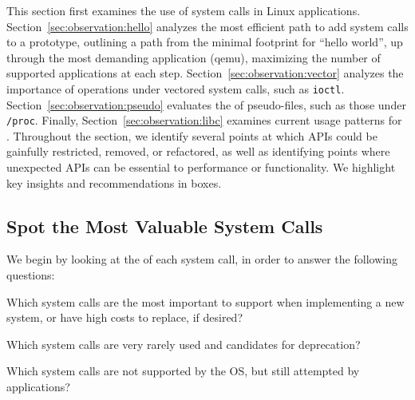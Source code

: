 This section first examines the use of system calls in Linux applications.
Section~\ref{sec:observation:hello} analyzes the most efficient path to add system calls
to a prototype, outlining a path from the minimal footprint for ``hello world'', 
up through the most demanding application (qemu), maximizing the number
of supported applications at each step.
Section~\ref{sec:observation:vector} analyzes the importance of operations
under vectored system calls, such as {\tt ioctl}.
Section~\ref{sec:observation:pseudo} evaluates the \usagemetric{} of 
pseudo-files, such as those under {\tt /proc}.
Finally, Section~\ref{sec:observation:libc}
examines current usage patterns for \libc{}.
Throughout the section, we identify several points at which APIs could be gainfully
restricted, removed, or refactored,
as well as identifying points where unexpected APIs can be essential to performance or
functionality.
We highlight key insights and recommendations in boxes.


\subsection{Spot the Most Valuable System Calls}
\label{sec:observation:syscall}

We begin by looking at the \usagemetric{} of each system call, 
in order to answer the following questions:
\begin{compactitem}
\item Which system calls are the most important to support when implementing a new system,
or have high costs to replace, if desired?
\item Which system calls are very rarely used and candidates for deprecation?
\item Which system calls are not supported by the OS, but still attempted by applications?
\end{compactitem}
\vspace{10pt}

